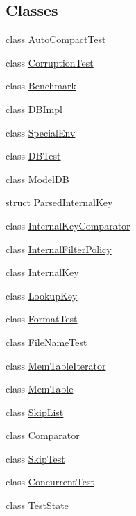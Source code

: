 \subsection*{Classes}
\begin{DoxyCompactItemize}
\item 
class \hyperlink{classleveldb_1_1_auto_compact_test}{Auto\-Compact\-Test}
\item 
class \hyperlink{classleveldb_1_1_corruption_test}{Corruption\-Test}
\item 
class \hyperlink{classleveldb_1_1_benchmark}{Benchmark}
\item 
class \hyperlink{classleveldb_1_1_d_b_impl}{D\-B\-Impl}
\item 
class \hyperlink{classleveldb_1_1_special_env}{Special\-Env}
\item 
class \hyperlink{classleveldb_1_1_d_b_test}{D\-B\-Test}
\item 
class \hyperlink{classleveldb_1_1_model_d_b}{Model\-D\-B}
\item 
struct \hyperlink{structleveldb_1_1_parsed_internal_key}{Parsed\-Internal\-Key}
\item 
class \hyperlink{classleveldb_1_1_internal_key_comparator}{Internal\-Key\-Comparator}
\item 
class \hyperlink{classleveldb_1_1_internal_filter_policy}{Internal\-Filter\-Policy}
\item 
class \hyperlink{classleveldb_1_1_internal_key}{Internal\-Key}
\item 
class \hyperlink{classleveldb_1_1_lookup_key}{Lookup\-Key}
\item 
class \hyperlink{classleveldb_1_1_format_test}{Format\-Test}
\item 
class \hyperlink{classleveldb_1_1_file_name_test}{File\-Name\-Test}
\item 
class \hyperlink{classleveldb_1_1_mem_table_iterator}{Mem\-Table\-Iterator}
\item 
class \hyperlink{classleveldb_1_1_mem_table}{Mem\-Table}
\item 
class \hyperlink{classleveldb_1_1_skip_list}{Skip\-List}
\item 
class \hyperlink{structleveldb_1_1_comparator}{Comparator}
\item 
class \hyperlink{classleveldb_1_1_skip_test}{Skip\-Test}
\item 
class \hyperlink{classleveldb_1_1_concurrent_test}{Concurrent\-Test}
\item 
class \hyperlink{classleveldb_1_1_test_state}{Test\-State}

\end{DoxyCompactItemize}
